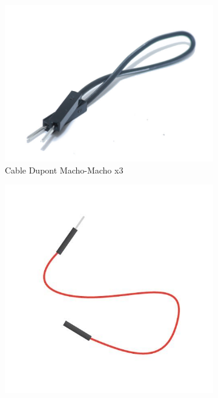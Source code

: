 \documentclass{article}
\begin{document}
\begin{figure}[H]
	\centering
	\begin{subfigure}[b]{0.3\textwidth}
		\includegraphics[width=\textwidth]{../images/cable_mm.jpg}
		\caption*{Cable Dupont Macho-Macho x3}
		\label{fig:cable mm}
	\end{subfigure}
	\hfill
	\begin{subfigure}[b]{0.3\textwidth}
		\includegraphics[width=\textwidth]{../images/cable_mh.jpg}

\end{subfigure}
\end{figure}
\end{document}
